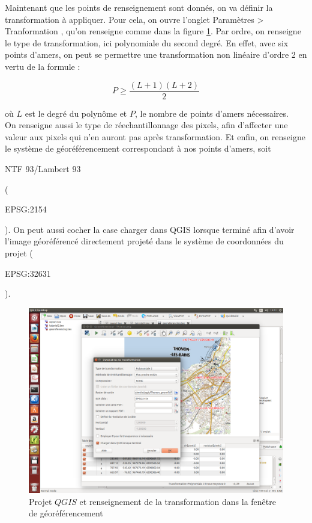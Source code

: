 \documentclass{book}
\begin{document}
Maintenant que les points de renseignement sont donnés, on va définir la transformation à appliquer. Pour cela, on ouvre l'onglet
 \og Paramètres > Tranformation \fg{}, qu'on renseigne comme dans la figure \ref{qgis-transformation}. Par ordre, 
on renseigne le type de transformation, ici polynomiale du second degré. En effet, avec six points d'amers, on peut se permettre
une transformation non linéaire d'ordre 2 en vertu de la formule \cite{Nicolas:2014}:

\[P\ge\frac{(L+1)(L+2)}{2}\]

où $L$ est le degré du polyn\^{o}me et $P$, le nombre de points d'amers nécessaires.\\
On renseigne aussi le type de réechantillonnage des pixels, afin d'affecter une valeur aux pixels qui n'en auront pas
après transformation. Et enfin, on renseigne le système de géoréférencement correspondant 
à nos points d'amers, soit \begin{itshape}NTF 93/Lambert 93\end{itshape} (\begin{itshape}EPSG:2154\end{itshape}). On peut aussi
 cocher la case \og charger dans QGIS lorsque terminé \fg{} afin d'avoir l'image géoréférencé directement
 projeté dans le système de coordonnées du projet (\begin{itshape}EPSG:32631\end{itshape}).

\begin{figure}[!h]
\begin{center}
\includegraphics[scale=0.3]{images/georeferencing/qgis-transformation.png}
\end{center}
\caption{Projet $QGIS$ et renseignement de la transformation dans la fen\^{e}tre de géoréférencement}
\label{qgis-transformation}
\end{figure}
\end{document}
